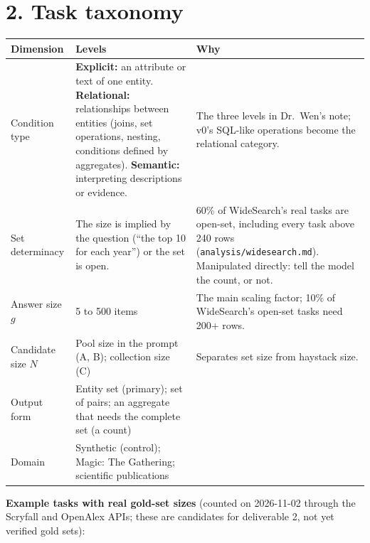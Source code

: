 \documentclass[10pt]{article}
\begin{document}
\section*{2. Task taxonomy}
{\small
\begin{tabularx}{\linewidth}{@{}L{2.5cm}YL{4.6cm}@{}}
\toprule
Dimension & Levels & Why \\
\midrule
Condition type & \textbf{Explicit:} an attribute or text of one entity. \textbf{Relational:} relationships
between entities (joins, set operations, nesting, conditions defined by aggregates). \textbf{Semantic:}
interpreting descriptions or evidence. & The three levels in Dr.\ Wen's note; v0's SQL-like operations become the
relational category. \\
Set determinacy & The size is implied by the question (``the top 10 for each year'') or the set is open. &
60\% of WideSearch's real tasks are open-set, including every task above 240 rows
(\texttt{analysis/widesearch.md}). Manipulated directly: tell the model the count, or not. \\
Answer size $g$ & 5 to 500 items & The main scaling factor; 10\% of WideSearch's open-set tasks need 200+ rows. \\
Candidate size $N$ & Pool size in the prompt (A, B); collection size (C) & Separates set size from haystack size. \\
Output form & Entity set (primary); set of pairs; an aggregate that needs the complete set (a count) & \\
Domain & Synthetic (control); Magic: The Gathering; scientific publications & \\
\bottomrule
\end{tabularx}}

\textbf{Example tasks with real gold-set sizes} (counted on 2026-11-02 through the Scryfall and OpenAlex APIs; these
are candidates for deliverable 2, not yet verified gold sets):
\end{document}
